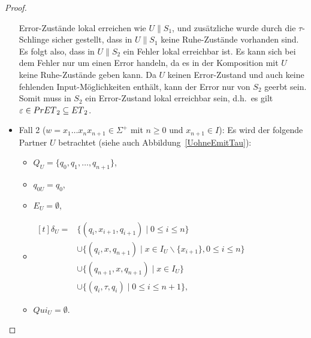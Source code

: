 \begin{proof}
\begin{itemize}
      Error-Zustände lokal erreichen wie $U\|S_1$, und zusätzliche wurde durch die
      $\tau$-Schlinge sicher gestellt, dass in $U\|S_1$ keine Ruhe-Zustände
      vorhanden sind. Es folgt also, dass in $U\|S_2$ ein Fehler lokal
      erreichbar ist. Es kann sich bei dem Fehler nur um einen Error handeln,
      da es in der Komposition mit $U$ keine Ruhe-Zustände geben kann. Da $U$
      keinen Error-Zustand und auch keine fehlenden Input-Möglichkeiten
      enthält, kann der Error nur von $S_2$ geerbt sein. Somit muss in $S_2$
      ein Error-Zustand lokal erreichbar sein, d.h.\ es gilt $\varepsilon\in
      PrET{}_2\subseteq ET{}_2$.
    \item Fall 2 ($w=x_1\dots x_nx_{n+1}\in\Sigma ^+$ mit $n\geq 0$ und
      $x_{n+1}\in I$): Es wird der folgende Partner $U$ betrachtet (siehe auch
      Abbildung~\ref{UohneEmitTau}):
      \begin{itemize}
        \item $Q_U=\{q_0,q_1,\dots ,q_{n+1}\}$,
        \item $q_{0U}=q_0$,
        \item $E_U=\emptyset$,
        \item $\begin{aligned}[t]
            \delta _U=&\{(q_i,x_{i+1},q_{i+1})\mid  0\leq i\leq n\}\\
                      &\cup\{(q_i,x,q_{n+1})\mid  x\in I_U\backslash\{x_{i+1}\},
          0\leq i\leq n\}\\
          &\cup\{(q_{n+1},x,q_{n+1})\mid  x\in I_U\}\\
          &\cup\{(q_i,\tau,q_i)\mid 0\leq i\leq n+1\},
        \end{aligned}$
        \item $Qui_U = \emptyset$.
      \end{itemize}
      \begin{figure} [h!tbp]
      \begin{center}
\end{center}
\end{figure}
\end{itemize}
\end{proof}
